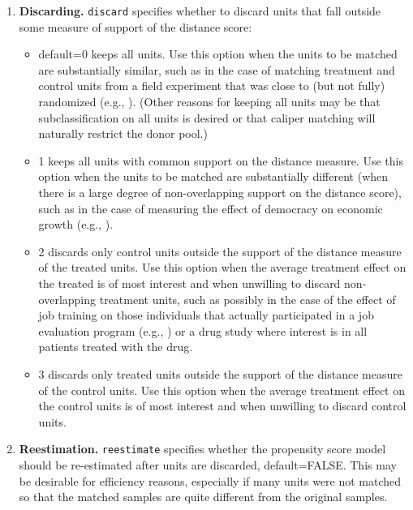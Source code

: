 \documentclass[oneside,letterpaper,titlepage]{article}
\begin{document}
\begin{enumerate}
\item \textbf{Discarding.} \texttt{discard} specifies whether to
  discard units that fall outside some measure of support of the
  distance score:
  \begin{itemize}
  \item default=0 keeps all units.  Use this option when the units to
    be matched are substantially similar, such as in the case of
    matching treatment and control units from a field experiment that
    was close to (but not fully) randomized (e.g., \citealt{Imai03}).
    (Other reasons for keeping all units may be that subclassification
    on all units is desired or that caliper matching will naturally
    restrict the donor pool.)
  \item 1 keeps all units with common support on the distance measure.
    Use this option when the units to be matched are substantially
    different (when there is a large degree of non-overlapping
    support on the distance score), such as in the case of measuring
    the effect of democracy on economic growth (e.g.,
    \citealt{KinZen03b}).
  \item 2 discards only control units outside the support of the
    distance measure of the treated units.  Use this option when the
    average treatment effect on the treated is of most interest and
    when unwilling to discard non-overlapping treatment units, such as
    possibly in the case of the effect of job training on those
    individuals that actually participated in a job evaluation program
    (e.g., \citealt{HecIchTod98}) or a drug study where interest is in all patients treated with the drug.
  \item 3 discards only treated units outside the support of the
    distance measure of the control units.  Use this option when the
    average treatment effect on the control units is of most interest
    and when unwilling to discard control units.
  \end{itemize}
  
\item \textbf{Reestimation.} \texttt{reestimate} specifies whether the
  propensity score model should be re-estimated after units are
  discarded, default=FALSE.  This may be desirable for efficiency
  reasons, especially if many units were not matched so that the
  matched samples are quite different from the original samples.


\end{enumerate}
\end{document}
